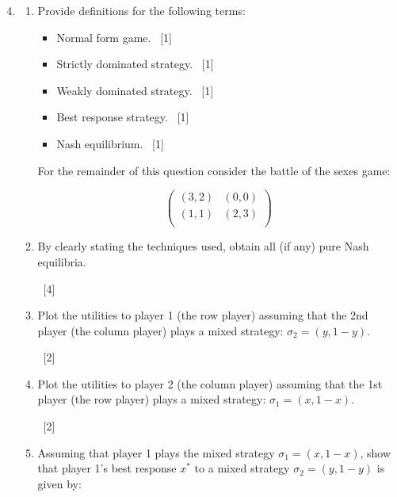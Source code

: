 \documentclass[12pt,a4paper]{article}
\renewcommand{\labelenumi}{\arabic{enumi}} %
\begin{document}
\begin{enumerate}
\setcounter{enumi}{3}

\renewcommand\labelenumi{\bfseries\theenumi.}

\item

    \begin{enumerate}
        \item Provide definitions for the following terms:
            \begin{itemize}
                \item Normal form game.  ~\hfill{[1]}

                \item Strictly dominated strategy.  ~\hfill{[1]}

                \item Weakly dominated strategy.  ~\hfill{[1]}

                \item Best response strategy.  ~\hfill{[1]}

                \item Nash equilibrium.  ~\hfill{[1]}
            \end{itemize}

        For the remainder of this question consider the battle of the sexes game:

            \[\begin{pmatrix}
            (3,2) & (0,0)\\
            (1,1) & (2,3)\\
            \end{pmatrix}\]

        \item By clearly stating the techniques used, obtain all (if any) pure Nash equilibria.

        ~\hfill{[4]}

        \item Plot the utilities to player 1 (the row player) assuming that the 2nd player (the column player) plays a mixed strategy: $\sigma_2 = (y,1-y)$.

        ~\hfill{[2]}

        \item Plot the utilities to player 2 (the column player) assuming that the 1st player (the row player) plays a mixed strategy: $\sigma_1 = (x,1-x)$.

        ~\hfill{[2]}

        \item Assuming that player 1 plays the mixed strategy $\sigma_1=(x,1-x)$, show that player 1's best response $x^*$ to a mixed strategy $\sigma_2 = (y,1-y)$ is given by:



\end{enumerate}
\end{enumerate}
\end{document}
